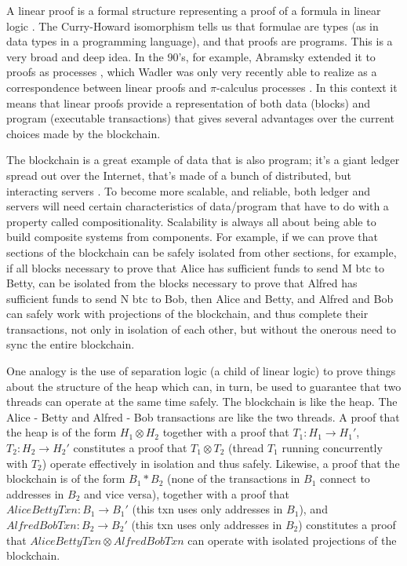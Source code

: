 \documentclass[]{acm_proc_article-sp}
\numberwithin{equation}{subsection}
\begin{document}
A linear proof is a formal structure representing a proof of a formula
in linear logic \cite{DBLP:journals/tcs/Girard87}.  The Curry-Howard
isomorphism \cite{Sorensen98lectureson} tells us that formulae are
types (as in data types in a programming language), and that proofs
are programs. This is a very broad and deep idea. In the 90's, for
example, Abramsky extended it to proofs as processes
\cite{DBLP:journals/tcs/Abramsky94}, which Wadler was only very
recently able to realize as a correspondence between linear proofs and
{$\pi$}-calculus processes \cite{DBLP:journals/jfp/Wadler14}. In this
context it means that linear proofs provide a representation of both
data (blocks) and program (executable transactions) that gives several
advantages over the current choices made by the blockchain.

The blockchain is a great example of data that is also program; it's a
giant ledger spread out over the Internet, that's made of a bunch of
distributed, but interacting servers \cite{Nakamoto2008}. To become
more scalable, and reliable, both ledger and servers will need certain
characteristics of data/program that have to do with a property called
compositionality. Scalability is always all about being able to build
composite systems from components. For example, if we can prove that
sections of the blockchain can be safely isolated from other sections,
for example, if all blocks necessary to prove that Alice has
sufficient funds to send M btc to Betty, can be isolated from the
blocks necessary to prove that Alfred has sufficient funds to send N
btc to Bob, then Alice and Betty, and Alfred and Bob can safely work
with projections of the blockchain, and thus complete their
transactions, not only in isolation of each other, but without the
onerous need to sync the entire blockchain.

One analogy is the use of separation logic (a child of linear logic)
\cite{DBLP:conf/vstte/Reynolds05} to prove things about the structure
of the heap which can, in turn, be used to guarantee that two threads
can operate at the same time safely. The blockchain is like the
heap. The Alice - Betty and Alfred - Bob transactions are like the two
threads. A proof that the heap is of the form $H_1 \otimes H_2$
together with a proof that $T_1 : H_1 \rightarrow H_1'$, $T_2 : H_2
\rightarrow H_2'$ constitutes a proof that $T_1 \otimes T_2$ (thread
$T_1$ running concurrently with $T_2$) operate effectively in
isolation and thus safely. Likewise, a proof that the blockchain is of
the form $B_1 * B_2$ (none of the transactions in $B_1$ connect to
addresses in $B_2$ and vice versa), together with a proof that
$AliceBettyTxn : B_1 \rightarrow B_1'$ (this txn uses only addresses
in $B_1$), and $AlfredBobTxn : B_2 \rightarrow B_2'$ (this txn uses
only addresses in $B_2$) constitutes a proof that $AliceBettyTxn
\otimes AlfredBobTxn$ can operate with isolated projections of the
blockchain.
\end{document}
